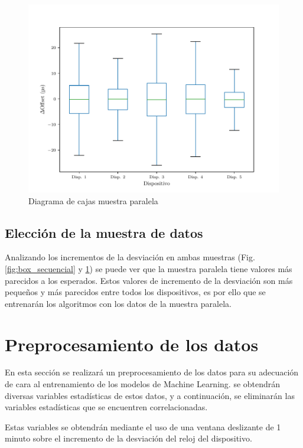 \begin{figure}
    \centering
    \includegraphics[scale=0.7]{../Python/plots/parallel/boxplot_no_out}
    \caption{Diagrama de cajas muestra paralela}
    \label{fig:box_paralelo}
\end{figure}

\subsection{Elección de la muestra de datos}

Analizando los incrementos de la desviación en ambas muestras (Fig. \ref{fig:box_secuencial} y \ref{fig:box_paralelo}) se puede ver que la muestra paralela tiene valores más parecidos a los esperados. Estos valores de incremento de la desviación son más pequeños y más parecidos entre todos los dispositivos, es por ello que se entrenarán los algoritmos con los datos de la muestra paralela.

\section{Preprocesamiento de los datos}

En esta sección se realizará un preprocesamiento de los datos para su adecuación de cara al entrenamiento de los modelos de Machine Learning. se obtendrán diversas variables estadísticas de estos datos, y a continuación, se eliminarán las variables estadísticas que se encuentren correlacionadas.

Estas variables se obtendrán mediante el uso de una ventana deslizante de \SI{1}{} minuto sobre el incremento de la desviación del reloj del dispositivo.

